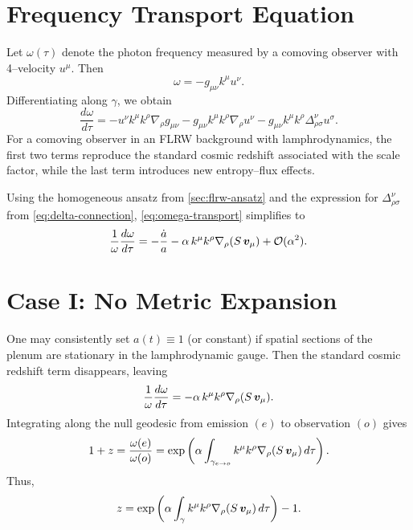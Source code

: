 \section{Frequency Transport Equation}

Let $\omega(\tau)$ denote the photon frequency measured by a comoving
observer with 4--velocity $u^\mu$. Then
\[
  \omega = - g_{\mu\nu} k^\mu u^\nu.
\]
Differentiating along $\gamma$, we obtain
\begin{equation}
\label{eq:omega-transport}
  \frac{d\omega}{d\tau}
  = -u^\nu k^\mu k^\rho \nabla_\rho g_{\mu\nu}
  - g_{\mu\nu} k^\mu k^\rho \nabla_\rho u^\nu
  - g_{\mu\nu} k^\mu k^\rho \Delta^\nu_{\rho\sigma} u^\sigma.
\end{equation}
For a comoving observer in an FLRW background with lamphrodynamics,
the first two terms reproduce the standard cosmic redshift associated
with the scale factor, while the last term introduces new entropy--flux
effects.

Using the homogeneous ansatz from \cref{sec:flrw-ansatz} and the expression
for $\Delta^\nu_{\rho\sigma}$ from \eqref{eq:delta-connection},
\eqref{eq:omega-transport} simplifies to
\begin{equation}
\label{eq:omega-transport2}
  \frac{1}{\omega}\frac{d\omega}{d\tau}
  = -\frac{\dot{a}}{a}
  - \alpha\,k^\mu k^\rho \nabla_\rho(S\,\bm{v}_\mu)
  + \mathcal{O}(\alpha^2).
\end{equation}

\section{Case I: No Metric Expansion}

One may consistently set $a(t)\equiv 1$ (or constant) if spatial sections of
the plenum are stationary in the lamphrodynamic gauge. Then the standard
cosmic redshift term disappears, leaving
\begin{equation}
\label{eq:no-expansion}
  \frac{1}{\omega}\frac{d\omega}{d\tau}
  = - \alpha\,k^\mu k^\rho \nabla_\rho(S\,\bm{v}_\mu).
\end{equation}
Integrating along the null geodesic from emission $(e)$ to observation $(o)$
gives
\begin{equation}
\label{eq:z-integral}
  1+z
  = \frac{\omega(e)}{\omega(o)}
  = \exp\left(
      \alpha\int_{\gamma_{e\to o}}
      k^\mu k^\rho \nabla_\rho(S\,\bm{v}_\mu)\,d\tau
    \right).
\end{equation}
Thus,
\[
  z = \exp\left(
      \alpha\int_{\gamma} k^\mu k^\rho \nabla_\rho(S\,\bm{v}_\mu)\,d\tau
    \right) - 1.
\]

